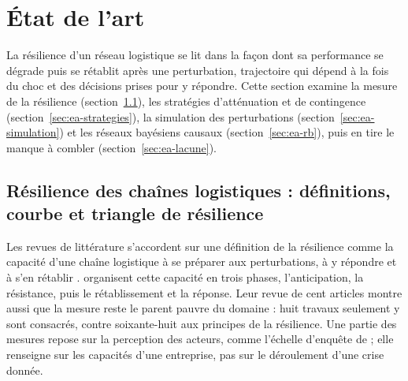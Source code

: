 
\section{État de l'art}
\label{sec:etat}

La résilience d'un réseau logistique se lit dans la façon dont sa performance se dégrade puis se rétablit après une perturbation, trajectoire qui dépend à la fois du choc et des décisions prises pour y répondre. Cette section examine la mesure de la résilience (section~\ref{sec:ea-mesure}), les stratégies d'atténuation et de contingence (section~\ref{sec:ea-strategies}), la simulation des perturbations (section~\ref{sec:ea-simulation}) et les réseaux bayésiens causaux (section~\ref{sec:ea-rb}), puis en tire le manque à combler (section~\ref{sec:ea-lacune}).

\subsection{Résilience des chaînes logistiques : définitions, courbe et triangle de résilience}
\label{sec:ea-mesure}

Les revues de littérature s'accordent sur une définition de la résilience comme la capacité d'une chaîne logistique à se préparer aux perturbations, à y répondre et à s'en rétablir \citep{tukamuhabwa2015, kamalahmadi2016}. \citet{kamalahmadi2016} organisent cette capacité en trois phases, l'anticipation, la résistance, puis le rétablissement et la réponse. Leur revue de cent articles montre aussi que la mesure reste le parent pauvre du domaine : huit travaux seulement y sont consacrés, contre soixante-huit aux principes de la résilience. Une partie des mesures repose sur la perception des acteurs, comme l'échelle d'enquête de \citet{chowdhury2017} ; elle renseigne sur les capacités d'une entreprise, pas sur le déroulement d'une crise donnée.

